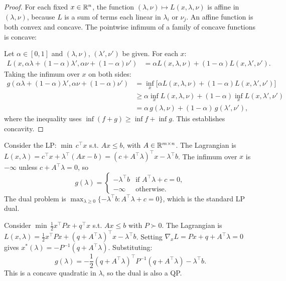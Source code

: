 \documentclass[11pt,a4paper]{article}
\begin{document}
\begin{proof}
For each fixed $x \in \mathbb{R}^n$, the function
$(\lambda, \nu) \mapsto L(x, \lambda, \nu)$ is affine in $(\lambda, \nu)$,
because $L$ is a sum of terms each linear in $\lambda_i$ or $\nu_j$. An
affine function is both convex and concave. The pointwise infimum of a family
of concave functions is concave:

Let $\alpha \in [0,1]$ and $(\lambda, \nu)$, $(\lambda', \nu')$ be given.
For each $x$:
\begin{align*}
  L(x, \alpha\lambda + (1{-}\alpha)\lambda', \alpha\nu + (1{-}\alpha)\nu')
  &= \alpha L(x, \lambda, \nu) + (1{-}\alpha) L(x, \lambda', \nu').
\end{align*}
Taking the infimum over $x$ on both sides:
\begin{align*}
  g(\alpha\lambda {+} (1{-}\alpha)\lambda', \alpha\nu {+} (1{-}\alpha)\nu')
  &= \inf_x \bigl[\alpha L(x,\lambda,\nu) + (1{-}\alpha) L(x,\lambda',\nu')\bigr] \\
  &\ge \alpha \inf_x L(x,\lambda,\nu) + (1{-}\alpha) \inf_x L(x,\lambda',\nu') \\
  &= \alpha\, g(\lambda,\nu) + (1{-}\alpha)\, g(\lambda',\nu'),
\end{align*}
where the inequality uses $\inf(f + g) \ge \inf f + \inf g$. This establishes
concavity.
\end{proof}

\begin{example}\label{ex:lp-dual}
Consider the LP: $\min\, c^\top x$ s.t. $Ax \le b$, with $A \in \mathbb{R}^{m \times n}$.
The Lagrangian is $L(x, \lambda) = c^\top x + \lambda^\top(Ax - b)
= (c + A^\top \lambda)^\top x - \lambda^\top b$.
The infimum over $x$ is $-\infty$ unless $c + A^\top \lambda = 0$, so
\[
  g(\lambda) = \begin{cases}
    -\lambda^\top b & \text{if } A^\top \lambda + c = 0, \\
    -\infty & \text{otherwise.}
  \end{cases}
\]
The dual problem is $\max_{\lambda \ge 0} \{-\lambda^\top b : A^\top \lambda + c = 0\}$,
which is the standard LP dual.
\end{example}

\begin{example}[Dual of a QP]\label{ex:qp-dual}
Consider $\min\, \frac{1}{2}x^\top P x + q^\top x$ s.t. $Ax \le b$ with
$P \succ 0$. The Lagrangian is
$L(x,\lambda) = \frac{1}{2}x^\top P x + (q + A^\top\lambda)^\top x - \lambda^\top b$.
Setting $\nabla_x L = Px + q + A^\top\lambda = 0$ gives
$x^*(\lambda) = -P^{-1}(q + A^\top\lambda)$. Substituting:
\[
  g(\lambda) = -\frac{1}{2}(q + A^\top\lambda)^\top P^{-1}(q + A^\top\lambda)
  - \lambda^\top b.
\]
This is a concave quadratic in $\lambda$, so the dual is also a QP.
\end{example}
\end{document}
